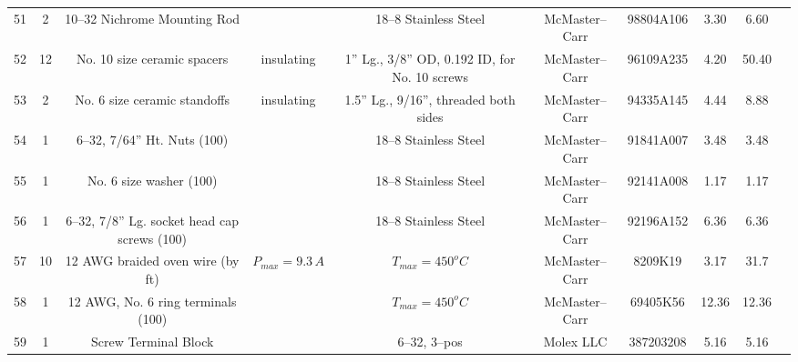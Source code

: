 \documentclass[10pt, twocolumn]{article}
\begin{document}
\begin{center}
\begin{adjustbox}{max width=\textwidth}
\begin{tabular}{c c c c c c c c c c}
51	&2	&10--32 Nichrome Mounting Rod		&	&18--8 Stainless Steel
	&McMaster--Carr	&98804A106		&3.30	&6.60	\\

52	&12	&No. 10 size ceramic spacers	&insulating	&1” Lg., 3/8” OD, 0.192 ID, for No. 10 screws
	&McMaster--Carr	&96109A235		&4.20	&50.40	\\

53	&2	&No. 6 size ceramic standoffs	&insulating	&1.5” Lg., 9/16”, threaded both sides
	&McMaster--Carr	&94335A145		&4.44	&8.88	\\

54	&1	&6--32, 7/64” Ht. Nuts (100)	&	&18--8 Stainless Steel
	&McMaster--Carr	&91841A007		&3.48	&3.48	\\

55	&1	&No. 6 size washer (100)	&	&18--8 Stainless Steel
	&McMaster--Carr	&92141A008		&1.17	&1.17	\\

56	&1	&6--32, 7/8” Lg. socket head cap screws (100)	&	&18--8 Stainless Steel
	&McMaster--Carr	&92196A152		&6.36	&6.36	\\

57	&10	&12 AWG braided oven wire (by ft)	&$P_{max}=9.3\,A$	&$T_{max}=450^{o}C$
	&McMaster--Carr	&8209K19		&3.17	&31.7	\\

58	&1	&12 AWG, No. 6 ring terminals (100)	&	&$T_{max}=450^{o}C$
	&McMaster--Carr	&69405K56		&12.36	&12.36	\\

59	&1	&Screw Terminal Block		&	&6--32, 3--pos
	&Molex LLC	&387203208		&5.16	&5.16	\\

\hline\hline
\end{tabular}
\end{adjustbox}
\label{bill-of-materials}
\end{center}
\end{document}
